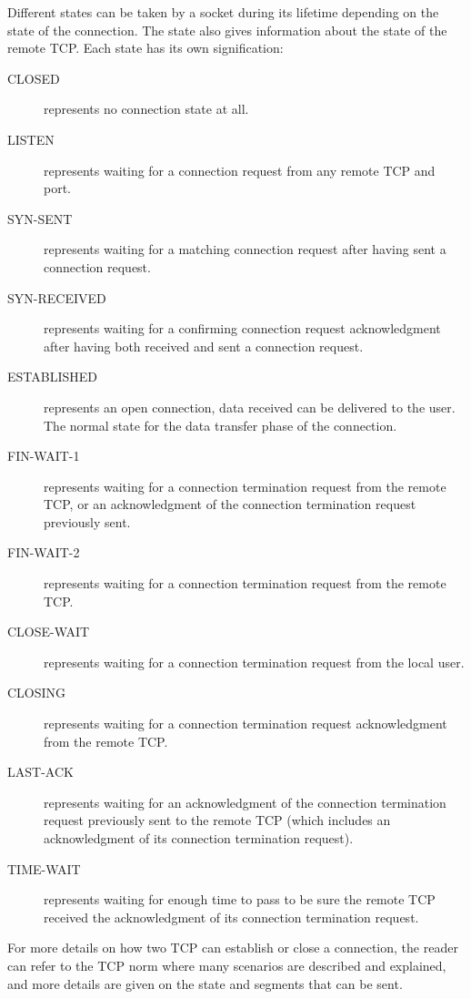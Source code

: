 \documentclass[a4paper, 10pt]{article}
\begin{document}
    Different states can be taken by a socket during its lifetime depending on the state
    of the connection. The state also gives information about the state of the remote TCP.
    Each state has its own signification:
    \begin{description}
        \item[CLOSED] represents no connection state at all.
        \item[LISTEN] represents waiting for a connection request from any remote
        TCP and port.
        \item[SYN-SENT] represents waiting for a matching connection request
        after having sent a connection request.
        \item[SYN-RECEIVED] represents waiting for a confirming connection
        request acknowledgment after having both received and sent a
        connection request.
        \item[ESTABLISHED] represents an open connection, data received can be
        delivered to the user. The normal state for the data transfer phase
        of the connection.
        \item[FIN-WAIT-1] represents waiting for a connection termination request
        from the remote TCP, or an acknowledgment of the connection
        termination request previously sent.
        \item[FIN-WAIT-2] represents waiting for a connection termination request
        from the remote TCP.
        \item[CLOSE-WAIT] represents waiting for a connection termination request
        from the local user.
        \item[CLOSING] represents waiting for a connection termination request
        acknowledgment from the remote TCP.
        \item[LAST-ACK] represents waiting for an acknowledgment of the
        connection termination request previously sent to the remote TCP
        (which includes an acknowledgment of its connection termination
        request).
        \item[TIME-WAIT] represents waiting for enough time to pass to be sure
        the remote TCP received the acknowledgment of its connection
        termination request.
    \end{description}

    For more details on how two TCP can establish or close a connection, the reader can refer
    to the TCP norm where many scenarios are described and explained, and more
    details are given on the state and segments that can be sent.
\end{document}
